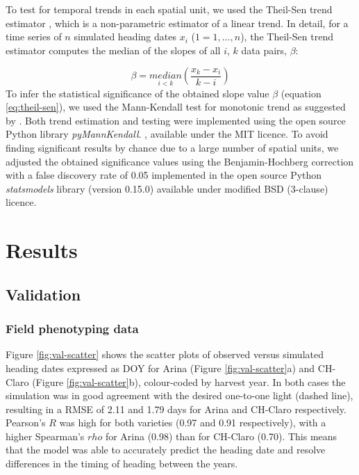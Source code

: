 To test for temporal trends in each spatial unit, we used the Theil-Sen trend estimator \citep{theil_rank-invariant_1950, sen_estimates_1968}, which is a non-parametric estimator of a linear trend. In detail, for a time series of $n$ simulated heading dates $x_i$ ($1 = 1, \dots, n$), the Theil-Sen trend estimator computes the median of the slopes of all $i$, $k$ data pairs, $\beta$:

\begin{equation}
\label{eq:theil-sen}
    \beta = \underset{i < k}{median} \left(\frac{x_k - x_i}{k - i}\right)
\end{equation}
To infer the statistical significance of the obtained slope value $\beta$ (equation \ref{eq:theil-sen}), we used the Mann-Kendall test for monotonic trend \citep{mann_nonparametric_1945, kendall_rank_1975} as suggested by \cite{hu_earlier_2005}. Both trend estimation and testing were implemented using the open source Python library \textsl{pyMannKendall}. \citep{hussain_pymannkendall_2019}, available under the MIT licence. To avoid finding significant results by chance due to a large number of spatial units, we adjusted the obtained significance values using the Benjamin-Hochberg correction \citep{benjamini_controlling_1995} with a false discovery rate of 0.05 implemented in the open source Python \textsl{statsmodels} library \citep{seabold_statsmodels_2010} (version 0.15.0) available under modified BSD (3-clause) licence.


\section{Results}
\label{sec:hd-results}
\subsection{Validation}
\subsubsection{Field phenotyping data}
\label{subsubsec:res-phenotyping}
Figure \ref{fig:val-scatter} shows the scatter plots of observed versus simulated heading dates expressed as \gls{DOY} for Arina (Figure \ref{fig:val-scatter}a) and CH-Claro (Figure \ref{fig:val-scatter}b), colour-coded by harvest year. In both cases the simulation was in good agreement with the desired one-to-one light (dashed line), resulting in a \gls{RMSE} of 2.11 and 1.79 days for Arina and CH-Claro respectively. Pearson's $R$ was high for both varieties (0.97 and 0.91 respectively), with a higher Spearman's $rho$ for Arina (0.98) than for CH-Claro (0.70). This means that the model was able to accurately predict the heading date and resolve differences in the timing of heading between the years.


